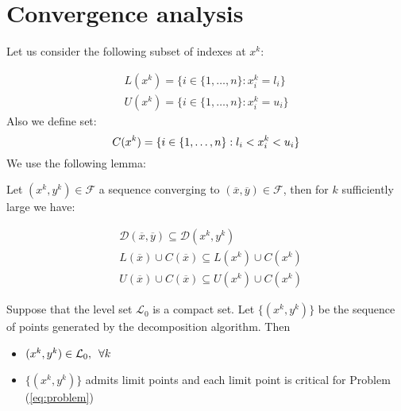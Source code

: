 \section{Convergence analysis}
Let us consider the following subset of indexes at $x^k$:

\begin{equation}\label{eq:indexes}
 \begin{aligned}
   L(x^k) =\{ i \in\{1,\ldots,n \}: x^k_i = l_i\}\\
  U(x^k) =\{i \in\{1,\ldots,n \} : x^k_i = u_i\}
 \end{aligned}
\end{equation}
Also we define set:
\begin{equation}
 C(x^k)=\{ i \in\{1,\ldots,n \}: l_i<x^k_i < u_i\}\\
\end{equation}
We use the following lemma:
\begin{lemma}\label{lem:direction}
 Let ${(x^k,y^k)} \in \mathcal{F}$ a sequence converging to $(\overline{x},\overline{y}) \in \mathcal{F}$, then for $k$ sufficiently large we have:
 
 \begin{subequations}
 \begin{align}
& \mathcal{D}(\overline{x},\overline{y}) \subseteq \mathcal{D}(x^k,y^k)\\
&L(\overline{x})\cup C(\overline{x})  \subseteq L(x^k)\cup C(x^k)\\
&U(\overline{x})\cup C(\overline{x})  \subseteq U(x^k)\cup C(x^k)
\end{align}
 \end{subequations}

\end{lemma}

\begin{proposition}
Suppose that the level set $\mathcal{L}_0$ is a compact set. Let $\{(x^k, y^k)\}$ be the sequence of points generated by the decomposition algorithm. Then
\begin{itemize}
\item $(x^k, y^k) \in \mathcal{L}_0, \enskip \forall k$ 
\item  $\{(x^k, y^k)\}$ admits limit points and each limit point is critical for Problem (\ref{eq:problem})
\end{itemize}
\end{proposition}

